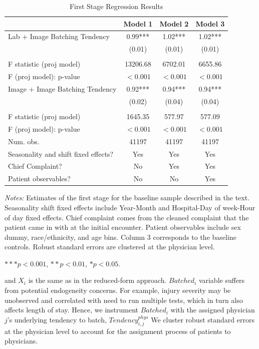 \documentclass[,,nonblindrev]{informs}
\begin{document}
\begin{table}[htbp]
\centering
\caption{First Stage Regression Results}
\begin{tabular}{lccc}
\toprule
 & Model 1 & Model 2 & Model 3 \\
\midrule
Lab + Image Batching Tendency & 0.99*** & 1.02*** & 1.02*** \\
 & (0.01) & (0.01) & (0.01) \\
\\
F statistic (proj model) & 13206.68 & 6702.01 & 6655.86  \\
F (proj model): p-value & $<0.001$ & $<0.001$ & $<0.001$ \\
\midrule
Image + Image Batching Tendency & 0.92*** & 0.94*** & 0.94*** \\
 & (0.02) & (0.04) & (0.04) \\
\\
F statistic (proj model) & 1645.35 & 577.97 & 577.09  \\
F (proj model): p-value & $<0.001$ & $<0.001$ & $<0.001$ \\
\midrule
\midrule
Num. obs. & 41197 & 41197 & 41197 \\
Seasonality and shift fixed effects? & Yes & Yes & Yes \\
Chief Complaint? & No & Yes & Yes \\
Patient observables? & No & No & Yes \\
\bottomrule
\end{tabular}
\begin{tablenotes}
\small
\item \textit{Notes:}  Estimates of the first stage for the baseline sample described in the text. Seasonality shift fixed effects include Year-Month and Hospital-Day of week-Hour of day fixed effects. Chief complaint comes from the cleaned complaint that the patient came in with at the initial encounter. Patient observables include sex dummy, race/ethnicity, and age bins. Column 3 corresponds to the baseline controls. Robust standard errors are clustered at the physician level.
\item $*** p < 0.001$, $** p < 0.01$, $* p < 0.05$.
\end{tablenotes}
\end{table}

and \(X_i\) is the same as in the reduced-form approach. \(Batched_i\)
variable suffers from potential endogeneity concerns. For example,
injury severity may be unobserved and correlated with need to run
multiple tests, which in turn also affects length of stay. Hence, we
instrument \(Batched_i\) with the assigned physician \(j\)'s underlying
tendency to batch, \(Tendency_{i,j}^{phys}\) We cluster robust standard
errors at the physician level to account for the assignment process of
patients to physicians.
\end{document}
